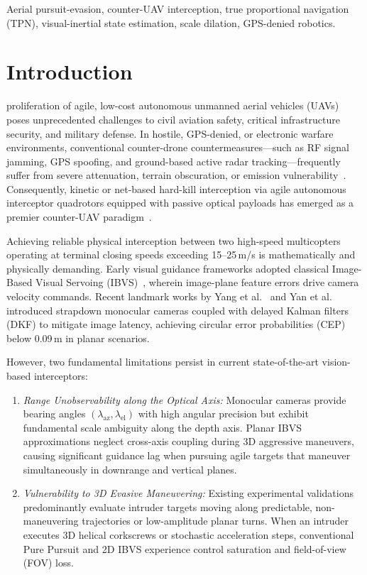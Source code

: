 \documentclass[lettersize,journal]{IEEEtran}
\begin{document}
\begin{IEEEkeywords}
Aerial pursuit-evasion, counter-UAV interception, true proportional navigation (TPN), visual-inertial state estimation, scale dilation, GPS-denied robotics.
\end{IEEEkeywords}

\section{Introduction}
 proliferation of agile, low-cost autonomous unmanned aerial vehicles (UAVs) poses unprecedented challenges to civil aviation safety, critical infrastructure security, and military defense. In hostile, GPS-denied, or electronic warfare environments, conventional counter-drone countermeasures—such as RF signal jamming, GPS spoofing, and ground-based active radar tracking—frequently suffer from severe attenuation, terrain obscuration, or emission vulnerability~\cite{dong2024design}. Consequently, kinetic or net-based hard-kill interception via agile autonomous interceptor quadrotors equipped with passive optical payloads has emerged as a premier counter-UAV paradigm~\cite{yan2024precise,yang2024highspeed}.

Achieving reliable physical interception between two high-speed multicopters operating at terminal closing speeds exceeding 15--25\,m/s is mathematically and physically demanding. Early visual guidance frameworks adopted classical Image-Based Visual Servoing (IBVS)~\cite{chaumette2006visual}, wherein image-plane feature errors drive camera velocity commands. Recent landmark works by Yang et al.~\cite{yang2024highspeed} and Yan et al.~\cite{yan2024precise} introduced strapdown monocular cameras coupled with delayed Kalman filters (DKF) to mitigate image latency, achieving circular error probabilities (CEP) below 0.09\,m in planar scenarios. 

However, two fundamental limitations persist in current state-of-the-art vision-based interceptors:
\begin{enumerate}
    \item \textit{Range Unobservability along the Optical Axis:} Monocular cameras provide bearing angles $(\lambda_{\text{az}}, \lambda_{\text{el}})$ with high angular precision but exhibit fundamental scale ambiguity along the depth axis. Planar IBVS approximations neglect cross-axis coupling during 3D aggressive maneuvers, causing significant guidance lag when pursuing agile targets that maneuver simultaneously in downrange and vertical planes.
    \item \textit{Vulnerability to 3D Evasive Maneuvering:} Existing experimental validations predominantly evaluate intruder targets moving along predictable, non-maneuvering trajectories or low-amplitude planar turns. When an intruder executes 3D helical corkscrews or stochastic acceleration steps, conventional Pure Pursuit and 2D IBVS experience control saturation and field-of-view (FOV) loss.
\end{enumerate}
\end{document}
